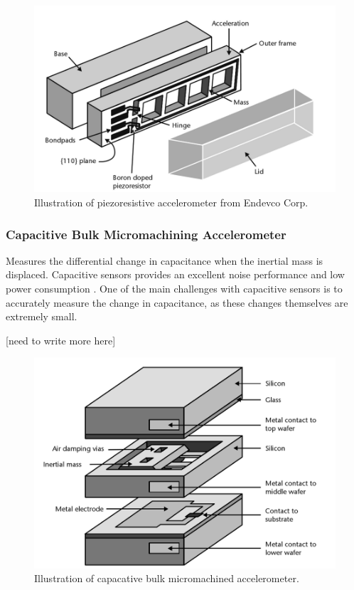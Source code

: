 \begin{figure}[h]
\centering
\includegraphics[scale=0.3]{fig/piezoresistive.png}
\caption{Illustration of piezoresistive accelerometer from Endevco Corp. \cite[p.~98]{maluf04}}
\label{fig:piezoresistive_accel}
\end{figure}

\subsubsection{Capacitive Bulk Micromachining Accelerometer}

Measures the differential change in capacitance when the inertial mass is displaced. Capacitive sensors provides an excellent noise performance and low power consumption \cite[p.~91]{kaajakari09}. One of the main challenges with capacitive sensors is to accurately measure the change in capacitance, as these changes themselves are extremely small.  

[need to write more here]

\begin{figure}[h]
\centering
\includegraphics[scale=0.3]{fig/bulk_micromachined.png}
\caption{Illustration of capacative bulk micromachined accelerometer. \cite[p.~100]{maluf04}}
\label{fig:bulk_micromachined}
\end{figure}

